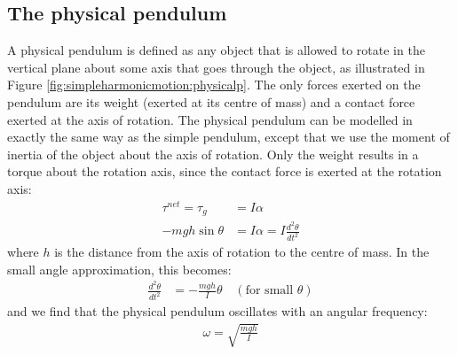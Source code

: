 \subsection{The physical pendulum}
A physical pendulum is defined as any object that is allowed to rotate in the vertical plane about some axis that goes through the object, as illustrated in Figure \ref{fig:simpleharmonicmotion:physicalp}.
The only forces exerted on the pendulum are its weight (exerted at its centre of mass) and a contact force exerted at the axis of rotation. The physical pendulum can be modelled in exactly the same way as the simple pendulum, except that we use the moment of inertia of the object about the axis of rotation. Only the weight results in a torque about the rotation axis, since the contact force is exerted at the rotation axis:
\begin{align*}
\tau^{net} = \tau_g &= I\alpha\\
-mgh\sin\theta &= I\alpha = I \frac{d^2\theta}{dt^2}
\end{align*}
where $h$ is the distance from the axis of rotation to the centre of mass. In the small angle approximation, this becomes:
\begin{align*}
\frac{d^2\theta}{dt^2} &=-\frac{mgh}{I}\theta \quad (\text{for small }\theta)
\end{align*}
and we find that the physical pendulum oscillates with an angular frequency:
\begin{align*}
\omega = \sqrt{\frac{mgh}{I}}
\end{align*}


\newpage
